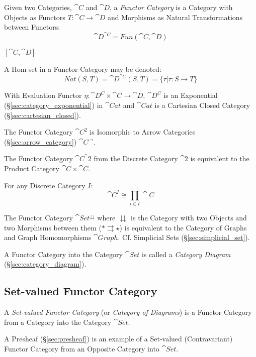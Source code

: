 Given two Categories, $\cat{C}$ and $\cat{D}$, a \emph{Functor
  Category} is a Category with Objects as Functors $T : \cat{C}
\rightarrow \cat{D}$ and Morphisms as Natural Transformations
between Functors:
\[
  \cat{D}^{\cat{C}} = Fun(\cat{C},\cat{D})
\]

$[\cat{C},\cat{D}]$

A Hom-set in a Functor Category may be denoted:
\[
  Nat(S,T) = \cat{D}^{\cat{C}}(S,T) =
    \{ \tau | \tau : S \rightarrow T \}
\]

With Evaluation Functor $\eta : \cat{D^C} \times \cat{C} \rightarrow
\cat{D}$, $\cat{D^C}$ is an Exponential
(\S\ref{sec:category_exponential}) in $\cat{Cat}$ and $\cat{Cat}$ is a
Cartesian Closed Category (\S\ref{sec:cartesian_closed}).

The Functor Category $\cat{C^2}$ is Isomorphic to Arrow Categories
(\S\ref{sec:arrow_category}) $\cat{C}^\rightarrow$.

The Functor Category $\cat{C}^\cat{2}$ from the Discrete Category
$\cat{2}$ is equivalent to the Product Category $\cat{C} \times
\cat{C}$.

For any Discrete Category $I$:
\[
  \cat{C}^I \cong \prod_{i \in I} \cat{C}
\]

The Functor Category $\cat{Set}^\downdownarrows$ where
$\downdownarrows$ is the Category with two Objects and two Morphisms
between them ($* \rightrightarrows \star$) is equivalent to the
Category of Graphs and Graph Homomorphisms $\cat{Graph}$. Cf.
Simplicial Sets (\S\ref{sec:simplicial_set}).

A Functor Category into the Category $\cat{Set}$ is called a
\emph{Category Diagram} (\S\ref{sec:category_diagram}).



\subsection{Set-valued Functor Category}\label{sec:setvalued_functor}

A \emph{Set-valued Functor Category} (or \emph{Category of Diagrams})
is a Functor Category from a Category into the Category
$\cat{Set}$.

A Presheaf (\S\ref{sec:presheaf}) is an example of a Set-valued
(Contravariant) Functor Category from an Opposite Category into
$\cat{Set}$.



